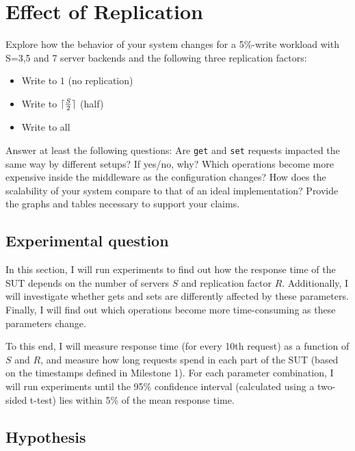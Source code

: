 \documentclass[11pt]{article}
\DeclarePairedDelimiter{\ceil}{\lceil}{\rceil}
\begin{document}
\clearpage
\section{Effect of Replication}

Explore how the behavior of your system changes for a 5\%-write workload with S=3,5 and 7 server backends and the following three replication factors:
\begin{itemize} 
\item Write to $1$ (no replication) 
\item Write to $\ceil{\frac{S}{2}}$ (half) 
\item Write to all 
\end{itemize}

Answer at least the following questions: Are \texttt{get} and \texttt{set} requests impacted the same way by different setups? If yes/no, why? Which operations become more expensive inside the middleware as the configuration changes? How does the scalability of your system compare to that of an ideal implementation? Provide the graphs and tables necessary to support your claims.


\subsection{Experimental question}

In this section, I will run experiments to find out how the response time of the SUT depends on the number of servers $S$ and replication factor $R$. Additionally, I will investigate whether gets and sets are differently affected by these parameters. Finally, I will find out which operations become more time-consuming as these parameters change.

To this end, I will measure response time (for every 10th request) as a function of $S$ and $R$, and measure how long requests spend in each part of the SUT (based on the timestamps defined in Milestone 1). For each parameter combination, I will run experiments until the 95\% confidence interval (calculated using a two-sided t-test) lies within 5\% of the mean response time.

\subsection{Hypothesis}
\end{document}
